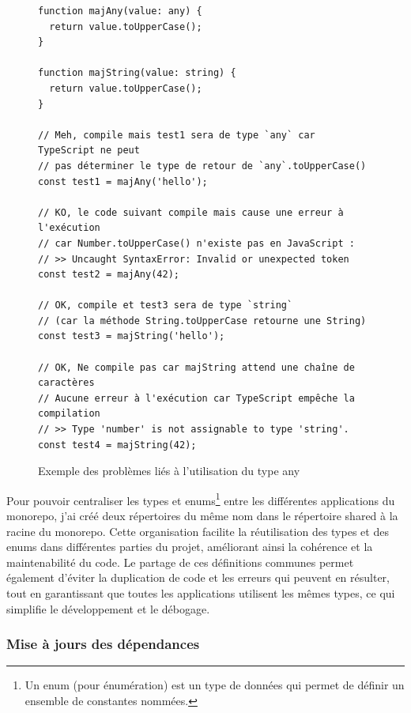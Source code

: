 \documentclass[12pt, a4paper]{report}
\begin{document}
\newpage
\begin{figure}[!h]
\begin{verbatim}
function majAny(value: any) {
  return value.toUpperCase();
}

function majString(value: string) {
  return value.toUpperCase();
}

// Meh, compile mais test1 sera de type `any` car TypeScript ne peut
// pas déterminer le type de retour de `any`.toUpperCase()
const test1 = majAny('hello');

// KO, le code suivant compile mais cause une erreur à l'exécution
// car Number.toUpperCase() n'existe pas en JavaScript :
// >> Uncaught SyntaxError: Invalid or unexpected token
const test2 = majAny(42);

// OK, compile et test3 sera de type `string` 
// (car la méthode String.toUpperCase retourne une String)
const test3 = majString('hello');

// OK, Ne compile pas car majString attend une chaîne de caractères
// Aucune erreur à l'exécution car TypeScript empêche la compilation
// >> Type 'number' is not assignable to type 'string'.
const test4 = majString(42);
\end{verbatim}
\vspace{-.8cm}
\caption{Exemple des problèmes liés à l'utilisation du type \flqq{} any \frqq{}}
\label{fig:type_any}
\end{figure}

	\noindent
	Pour pouvoir centraliser les types et enums\footnote{Un enum (pour énumération) est un type de données qui permet de définir un ensemble de constantes nommées.} entre les différentes applications du monorepo, j'ai créé deux répertoires du même nom dans le répertoire \flqq{} shared \frqq{} à la racine du monorepo. Cette organisation facilite la réutilisation des types et des enums dans différentes parties du projet, améliorant ainsi la cohérence et la maintenabilité du code. Le partage de ces définitions communes permet également d'éviter la duplication de code et les erreurs qui peuvent en résulter, tout en garantissant que toutes les applications utilisent les mêmes types, ce qui simplifie le développement et le débogage.

	\newpage
	\subsubsection{Mise à jours des dépendances}
\end{document}
